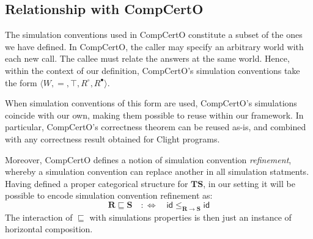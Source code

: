 \documentclass[acmsmall,screen,review,anonymous]{acmart}
\newcommand{\kw}[1]{\ensuremath{ \mathsf{#1} }}
\newcommand{\que}{\circ}
\newcommand{\ans}{\bullet}
\begin{document}


\subsection{Relationship with CompCertO} %

The simulation conventions used in CompCertO
constitute a subset of the ones we have defined.
In CompCertO,
the caller may specify an arbitrary world with each new call.
The callee must relate the answers at the same world.
Hence,
within the context of our definition,
CompCertO's simulation conventions
take the form $\langle W, {=}, \top, R^\que, R^\ans \rangle$.

When simulation conventions of this form are used,
CompCertO's simulations coincide with our own,
making them possible to reuse within our framework.
In particular,
CompCertO's correctness theorem can be reused as-is,
and combined with any correctness result
obtained for Clight programs.

Moreover,
CompCertO defines a notion of simulation convention \emph{refinement},
whereby a simulation convention
can replace another in all simulation statments.
Having defined a proper categorical structure for $\mathbf{TS}$,
in our setting
it will be possible to encode simulation convention refinement as:
\[
  \mathbf{R} \sqsubseteq \mathbf{S} \quad :\Leftrightarrow \quad
    \kw{id} \le_{\mathbf{R} \rightarrow \mathbf{S}} \kw{id}
\]
The interaction of $\sqsubseteq$ with simulations properties
is then just an instance of horizontal composition.
\end{document}
